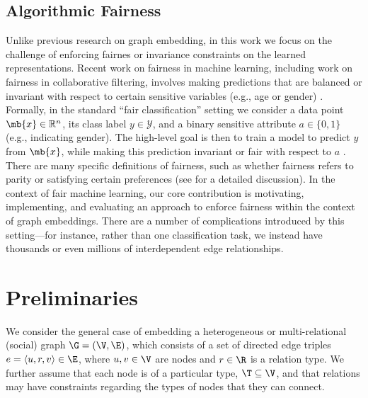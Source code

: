 \subsection{Algorithmic Fairness}\label{sec:relatedfair}
Unlike previous research on graph embedding, in this work we focus on the challenge of enforcing fairnes or invariance constraints on the learned representations. 
Recent work on fairness in machine learning, including work on fairness in collaborative filtering, involves making predictions that are balanced or invariant with respect to certain sensitive variables (e.g., age or gender) \cite{chouldechova2017fair,gajane2017formalizing,kamishima2012fairness,madras2018learning,zemel2013learning,yao2017new}. 
Formally, in the standard ``fair classification'' setting we consider a data point $\mb{x} \in \mathbb{R}^n$, its class label $y \in \mathcal{Y}$, and a binary sensitive attribute $a \in \{0,1\}$ (e.g., indicating gender). 
The high-level goal is then to train a model to predict $y$ from $\mb{x}$, while making this prediction invariant or fair with respect to $a$ \cite{madras2018learning}.
There are many specific definitions of fairness, such as whether fairness refers to parity or satisfying certain preferences (see \cite{gajane2017formalizing} for a detailed discussion).
In the context of fair machine learning, our core contribution is motivating, implementing, and evaluating an approach to enforce fairness within the context of graph embeddings.
There are a number of complications introduced by this setting---for instance, rather than one classification task, we instead have thousands or even millions of interdependent edge relationships. 

\section{Preliminaries}
We consider the general case of embedding a heterogeneous or multi-relational (social) graph $\G = (\V, \E)$, which consists of a set of directed edge triples $e=\langle u, r, v \rangle \in \E$, where $u, v \in \V$ are nodes and $r \in \R$ is a relation type.
We further assume that each node is of a particular type, $\T \subseteq \V$, and that relations may have constraints regarding the types of nodes that they can connect. 

